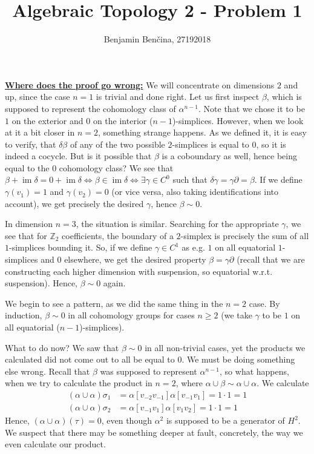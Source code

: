 \documentclass[a4paper, 12pt]{article}
\title{Algebraic Topology 2 - Problem 1}
\author{Benjamin Benčina, 27192018}
\DeclareMathOperator{\im}{im}
\newcommand{\Z}{\mathbb{Z}}
\begin{document}
\maketitle
\underline{\textbf{Where does the proof go wrong:}}
We will concentrate on dimensions $2$ and up, since the case $n=1$ is trivial and done right.
Let us first inspect $\beta$, which is supposed to represent the cohomology class of $\alpha^{n-1}$. Note that we chose it to be $1$ on the exterior and $0$ on the interior ($n-1$)-simplices. However, when we look at it a bit closer in $n=2$, something strange happens. As we defined it, it is easy to verify, that $\delta\beta$ of any of the two possible $2$-simplices is equal to $0$, so it is indeed a cocycle. But is it possible that $\beta$ is a coboundary as well, hence being equal to the $0$ cohomology class?
We see that $\beta + \im\delta  = 0 + \im\delta \iff \beta \in \im\delta \iff \exists \gamma \in C^0$ such that $\delta\gamma = \gamma\partial = \beta$. If we define $\gamma(v_1) = 1$ and $\gamma(v_2) = 0$ (or vice versa, also taking identifications into account), we get precisely the desired $\gamma$, hence $\beta \sim 0$.

In dimension $n=3$, the situation is similar. Searching for the appropriate $\gamma$, we see that for $\Z_2$ coefficients, the boundary of a $2$-simplex is precisely the sum of all $1$-simplices bounding it. So, if we define $\gamma \in C^1$ as e.g. $1$ on all equatorial $1$-simplices and $0$ elsewhere, we get the desired property $\beta = \gamma\partial$ (recall that we are constructing each higher dimension with suspension, so equatorial w.r.t. suspension). Hence, $\beta \sim 0$ again.

We begin to see a pattern, as we did the same thing in the $n=2$ case. By induction, $\beta \sim 0$ in all cohomology groups for cases $n \geq 2$ (we take $\gamma$ to be $1$ on all equatorial ($n-1$)-simplices).

What to do now? We saw that $\beta \sim 0$ in all non-trivial cases, yet the products we calculated did not come out to all be equal to $0$. We must be doing something else wrong. Recall that $\beta$ was supposed to represent $\alpha^{n-1}$, so what happens, when we try to calculate the product in $n=2$, where $\alpha \cup \beta \sim \alpha \cup \alpha$. We calculate
\begin{align*}
(\alpha \cup \alpha)\sigma_1 &= \alpha[v_{-2}v_{-1}]\alpha[v_{-1}v_1] = 1\cdot 1 = 1 \\
(\alpha \cup \alpha)\sigma_2 &= \alpha[v_{-1}v_1]\alpha[v_1v_2] = 1\cdot 1 = 1
\end{align*}
Hence, $(\alpha \cup \alpha)(\tau) = 0$, even though $\alpha^2$ is supposed to be a generator of $H^2$. We suspect that there may be something deeper at fault, concretely, the way we even calculate our product.
\end{document}
